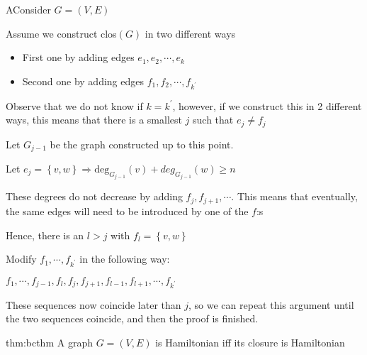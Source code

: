 \begin{prf}
  AConsider $G = (V,E)$\par
  \noindent Assume we construct clos$(G)$ in two different ways\par
  \begin{itemize}
    \item First one by adding edges $e_1,e_2,\cdots,e_k$\par
    \item Second one by adding edges $f_1,f_2,\cdots,f_{k^{\prime}}$ 
  \end{itemize}
  \par\bigskip
  \noindent Observe that we do not know if $k = k^{\prime}$, however, if we construct this in 2 different ways, this means that there is a smallest $j$ such that $e_j\neq f_j$
  \par\bigskip
  \noindent Let $G_{j-1}$ be the graph constructed up to this point.
  \par\bigskip
  \noindent Let $e_j = \left\{v,w\right\}\Rightarrow\text{deg}_{G_{j-1}}(v)+deg_{G_{j-1}}(w)\geq n$
  \par\bigskip
  \noindent These degrees do not decrease by adding $f_j,f_{j+1},\cdots$. This means that eventually, the same edges will need to be introduced by one of the $f$:s
  \par\bigskip
  \noindent Hence, there is an $l>j$ with $f_l = \left\{v,w\right\}$
  \par\bigskip
  \noindent Modify $f_1,\cdots,f_{k^{\prime}}$ in the following way:\par
  $f_1,\cdots,f_{j-1},f_l, f_j,f_{j+1},f_{l-1}, f_{l+1},\cdots, f_{k^{\prime}}$
  \par\bigskip
  \noindent These sequences now coincide later than $j$, so we can repeat this argument until  the two sequences coincide, and then the proof is finished.
\end{prf}
\newpage
\begin{theo}{thm:bcthm}
  A graph $G = (V,E)$ is Hamiltonian iff its closure is Hamiltonian
\end{theo}
\par\bigskip
